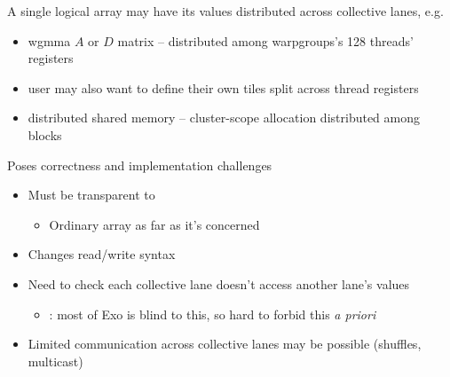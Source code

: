 \begin{minipage}[t]{0.48\textwidth}\fixminipage

A single logical array may have its values distributed across collective lanes, e.g.
\begin{itemize}
  \item wgmma $A$ or $D$ matrix -- distributed among warpgroups's 128 threads' registers
  \item user may also want to define their own tiles split across thread registers
  \item distributed shared memory -- cluster-scope allocation distributed among blocks
\end{itemize}

Poses correctness and implementation challenges
\begin{itemize}
  \item Must be transparent to 
  \begin{itemize}
    \item Ordinary array as far as it's concerned
  \end{itemize}
  \item Changes read/write syntax
  \item Need to check each collective lane doesn't access another lane's values
  \begin{itemize}
    \item {}: most of Exo is blind to this, so hard to forbid this \textit{a priori}
  \end{itemize}
  \item Limited communication across collective lanes may be possible (shuffles, multicast)
\end{itemize}

\end{minipage}
\hfill
